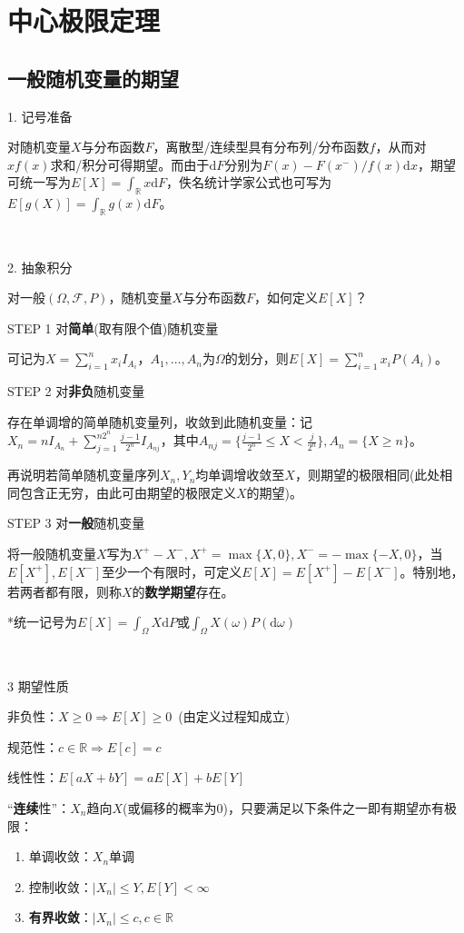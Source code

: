 \documentclass[a4paper,UTF8,fontset=windows]{ctexart}
\begin{document}
\section{中心极限定理}
\subsection{一般随机变量的期望}
1. 记号准备

对随机变量$X$与分布函数$F$，离散型/连续型具有分布列/分布函数$f$，从而对$xf(x)$求和/积分可得期望。而由于$\mathrm{d}F$分别为$F(x)-F(x^-)/f(x)\mathrm{d}x$，期望可统一写为$E[X]=\int_\mathbb{R}x\mathrm{d}F$，佚名统计学家公式也可写为$E[g(X)]=\int_\mathbb{R}g(x)\mathrm{d}F$。

~

2. 抽象积分

对一般$(\Omega,\mathcal{F},P)$，随机变量$X$与分布函数$F$，如何定义$E[X]$？

STEP 1 对\textbf{简单}(取有限个值)随机变量

可记为$X=\sum_{i=1}^nx_iI_{A_i}$，$A_1,\dots,A_n$为$\Omega$的划分，则$E[X]=\sum_{i=1}^nx_iP(A_i)$。

STEP 2 对\textbf{非负}随机变量

存在单调增的简单随机变量列，收敛到此随机变量：记$X_n=nI_{A_n}+\sum_{j=1}^{n2^n}\frac{j-1}{2^n}I_{A_{nj}}$，其中$A_{nj}=\{\frac{j-1}{2^n}\le X<\frac{j}{2^n}\},A_n=\{X\ge n\}$。

再说明若简单随机变量序列$X_n,Y_n$均单调增收敛至$X$，则期望的极限相同(此处相同包含正无穷，由此可由期望的极限定义$X$的期望)。

STEP 3 对\textbf{一般}随机变量

将一般随机变量$X$写为$X^+-X^-,X^+=\max\{X,0\},X^-=-\max\{-X,0\}$，当$E[X^+],E[X^-]$至少一个有限时，可定义$E[X]=E[X^+]-E[X^-]$。特别地，若两者都有限，则称$X$的\textbf{数学期望}存在。

*统一记号为$E[X]=\int_\Omega X\mathrm{d}P$或$\int_\Omega X(\omega)P(\mathrm{d}\omega)$

~

3 期望性质

非负性：$X\ge0\Rightarrow E[X]\ge0$\ (由定义过程知成立)

规范性：$c\in\mathbb{R}\Rightarrow E[c]=c$\ 

线性性：$E[aX+bY]=aE[X]+bE[Y]$

“\textbf{连续}性”：$X_n$趋向$X$(或偏移的概率为0)，只要满足以下条件之一即有期望亦有极限：

\begin{enumerate}
	\item 单调收敛：$X_n$单调
	\item 控制收敛：$|X_n|\le Y,E[Y]<\infty$
	\item \textbf{有界收敛}：$|X_n|\le c,c\in\mathbb{R}$
\end{enumerate}
\end{document}
